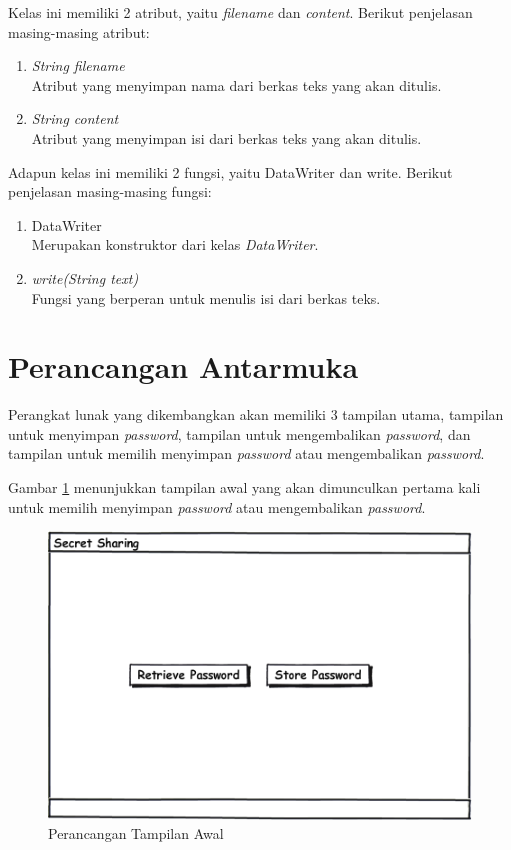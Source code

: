 Kelas ini memiliki 2 atribut, yaitu \textit{filename} dan \textit{content}. Berikut penjelasan masing-masing atribut:

\begin{enumerate}
	\item \textit{String filename} \\
	Atribut yang menyimpan nama dari berkas teks yang akan ditulis.
	\item \textit{String content} \\
	Atribut yang menyimpan isi dari berkas teks yang akan ditulis.
\end{enumerate}

Adapun kelas ini memiliki 2 fungsi, yaitu DataWriter dan write. Berikut penjelasan masing-masing fungsi:

\begin{enumerate}
	\item DataWriter \\
	Merupakan konstruktor dari kelas \textit{DataWriter}.
	\item \textit{write(String text)} \\
	Fungsi yang berperan untuk menulis isi dari berkas teks.
\end{enumerate}

\section{Perancangan Antarmuka}

Perangkat lunak yang dikembangkan akan memiliki 3 tampilan utama, tampilan untuk menyimpan \textit{password}, tampilan untuk mengembalikan \textit{password}, dan tampilan untuk memilih menyimpan \textit{password} atau mengembalikan \textit{password}.

Gambar \ref{fig:tampilan-awal} menunjukkan tampilan awal yang akan dimunculkan pertama kali untuk memilih menyimpan \textit{password} atau mengembalikan \textit{password}.

\begin{figure}[H]
	\centerline{\includegraphics[scale=0.5]{Gambar/tampilan-utama}}
	\caption{Perancangan Tampilan Awal}\label{fig:tampilan-awal}
\end{figure}

